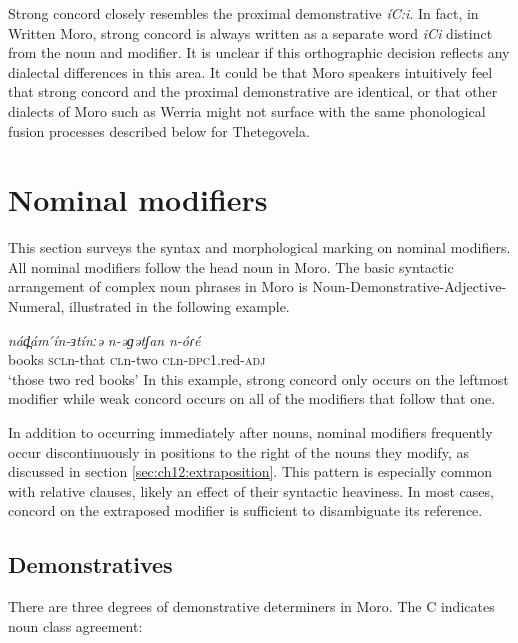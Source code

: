 Strong concord closely resembles the proximal demonstrative \textit{íC:i}. In fact, in Written Moro, strong concord is always written as a separate word \textit{iCi} distinct from the noun and modifier. It is unclear if this orthographic decision reflects any dialectal differences in this area. It could be that Moro speakers intuitively feel that strong concord and the proximal demonstrative are identical, or that other dialects of Moro such as Werria might not surface with the same phonological fusion processes described below for Thetegovela. %

\section{Nominal modifiers}\label{sec:ch8:nporder}

This section surveys the syntax and morphological marking on nominal modifiers. All nominal modifiers follow the head noun in Moro. The basic syntactic arrangement of complex noun phrases in Moro is Noun-Demonstrative-Adjective-Numeral, illustrated in the following example.

\ea \label{ex:ch8:1}
	\gll	\textit{nád̪ám}	\textit{́ín-ɜtínːə}	\textit{n-əɡətʃan}	\textit{n-óɾé}	   \\
			books	\textsc{scl}n-that	\textsc{cl}n-two	\textsc{cl}n-\textsc{dpc1}.red-\textsc{adj} \\
	\glt	‘those two red books’
\z 
In this example, strong concord only occurs on the leftmost modifier while weak concord occurs on all of the modifiers that follow that one. 

In addition to occurring immediately after nouns, nominal modifiers frequently occur discontinuously in positions to the right of the nouns they modify, as discussed in section \ref{sec:ch12:extraposition}. This pattern is especially common with relative clauses, likely an effect of their syntactic heaviness. In most cases, concord on the extraposed modifier is sufficient to disambiguate its reference.




\subsection{Demonstratives}\label{demonstratives}

There are three degrees of demonstrative determiners in Moro. The C indicates noun class agreement:

